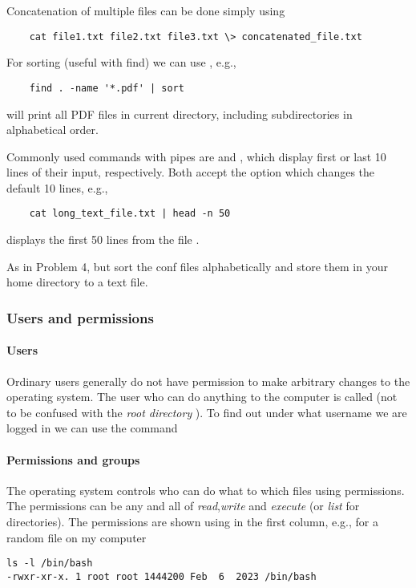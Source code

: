 Concatenation of multiple files can be done simply using 
\begin{lstlisting}
    cat file1.txt file2.txt file3.txt \> concatenated_file.txt
\end{lstlisting}

For sorting (useful with find) we can use , e.g.,
\begin{lstlisting}
    find . -name '*.pdf' | sort
\end{lstlisting}
will print all PDF files in current directory, including subdirectories
in alphabetical order.

Commonly used commands with pipes are  and , which display first or last 10 lines of their input, respectively. Both accept the option  which changes the default 10 lines, e.g.,
\begin{lstlisting}
    cat long_text_file.txt | head -n 50
\end{lstlisting}
displays the first 50 lines from the file .

\begin{exercise}
    As in Problem 4, but sort the conf files alphabetically and store them in your home directory to a text file.
\end{exercise}

\subsubsection{Users and permissions}

\paragraph{Users}
Ordinary users generally do not have permission to make arbitrary changes to the operating system. The user who can do anything to the computer is called  (not to be confused with the \emph{root directory} \ls{/}). To find out under what username we are logged in we can use the command 

\paragraph{Permissions and groups}

The operating system controls who can do what to which files using permissions. The permissions can be any and all of \emph{read},\emph{write} and \emph{execute} (or \emph{list} for directories). The permissions are shown using  in the first column, e.g., for a random file on my computer
\begin{lstlisting}
ls -l /bin/bash
-rwxr-xr-x. 1 root root 1444200 Feb  6  2023 /bin/bash
\end{lstlisting}

